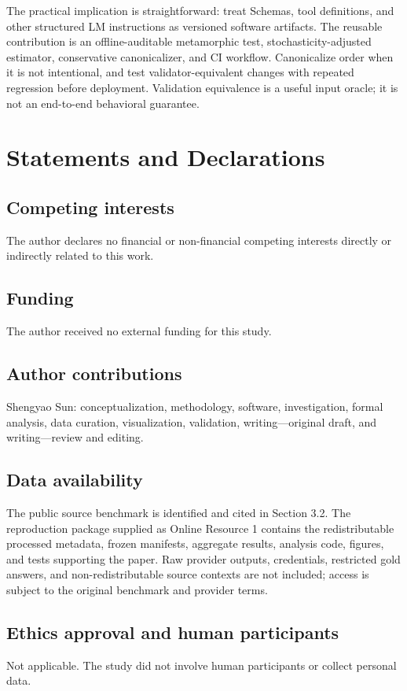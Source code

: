\documentclass[11pt,a4paper]{article}
\begin{document}
The practical implication is straightforward: treat Schemas, tool definitions, and other structured LM instructions as versioned software artifacts. The reusable contribution is an offline-auditable metamorphic test, stochasticity-adjusted estimator, conservative canonicalizer, and CI workflow. Canonicalize order when it is not intentional, and test validator-equivalent changes with repeated regression before deployment. Validation equivalence is a useful input oracle; it is not an end-to-end behavioral guarantee.

\section{Statements and Declarations}
\subsection{Competing interests}
The author declares no financial or non-financial competing interests directly or indirectly related to this work.

\subsection{Funding}
The author received no external funding for this study.

\subsection{Author contributions}
Shengyao Sun: conceptualization, methodology, software, investigation, formal analysis, data curation, visualization, validation, writing---original draft, and writing---review and editing.

\subsection{Data availability}
The public source benchmark is identified and cited in Section 3.2. The reproduction package supplied as Online Resource 1 contains the redistributable processed metadata, frozen manifests, aggregate results, analysis code, figures, and tests supporting the paper. Raw provider outputs, credentials, restricted gold answers, and non-redistributable source contexts are not included; access is subject to the original benchmark and provider terms.

\subsection{Ethics approval and human participants}
Not applicable. The study did not involve human participants or collect personal data.



\end{document}
